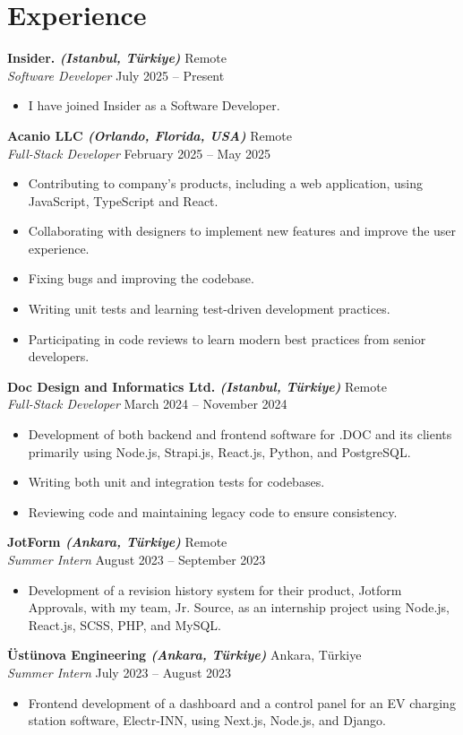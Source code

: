 \documentclass[10pt,a4paper]{extarticle}
\begin{document}
\section{Experience}
\textbf{Insider. \textit{(Istanbul, Türkiye)}} \hfill Remote\\
\textit{Software Developer} \hfill July 2025 -- Present
\begin{itemize}[leftmargin=*,noitemsep,topsep=0pt]
    \item I have joined Insider as a Software Developer.
\end{itemize}
\textbf{Acanio LLC \textit{(Orlando, Florida, USA)}} \hfill Remote\\
\textit{Full-Stack Developer} \hfill February 2025 -- May 2025
\begin{itemize}[leftmargin=*,noitemsep,topsep=0pt]
    \item Contributing to company's products, including a web application, using JavaScript, TypeScript and React.
    \item Collaborating with designers to implement new features and improve the user experience.
    \item Fixing bugs and improving the codebase.
    \item Writing unit tests and learning test-driven development practices.
    \item Participating in code reviews to learn modern best practices from senior developers.
\end{itemize}
\textbf{Doc Design and Informatics Ltd. \textit{(Istanbul, Türkiye)}} \hfill Remote\\
\textit{Full-Stack Developer} \hfill March 2024 -- November 2024
\begin{itemize}[leftmargin=*,noitemsep,topsep=0pt]
    \item Development of both backend and frontend software for .DOC and its clients primarily using Node.js, Strapi.js, React.js, Python, and PostgreSQL.
    \item Writing both unit and integration tests for codebases.
    \item Reviewing code and maintaining legacy code to ensure consistency.
\end{itemize}
\textbf{JotForm \textit{(Ankara, Türkiye)}} \hfill Remote\\
\textit{Summer Intern} \hfill August 2023 -- September 2023
\begin{itemize}[leftmargin=*,noitemsep,topsep=0pt]
    \item Development of a revision history system for their product, Jotform Approvals, with my team, Jr. Source, as an internship project using Node.js, React.js, SCSS, PHP, and MySQL.
\end{itemize}
\textbf{Üstünova Engineering \textit{(Ankara, Türkiye)}} \hfill Ankara, Türkiye\\
\textit{Summer Intern} \hfill July 2023 -- August 2023
\begin{itemize}[leftmargin=*,noitemsep,topsep=0pt]
    \item Frontend development of a dashboard and a control panel for an EV charging station software, Electr-INN, using Next.js, Node.js, and Django.
\end{itemize}
\end{document}
